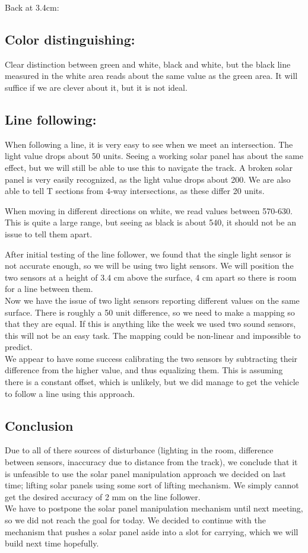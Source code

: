 Back at 3.4cm:

\subsection{Color distinguishing:}
Clear distinction
between green and white, black and white, but the black line measured in
the white area reads about the same value as the green area. It will
suffice if we are clever about it, but it is not ideal.

\subsection{Line following:}
When following a line, it is very easy to see when we meet
an intersection. The light value drops about 50 units. Seeing a working
solar panel has about the same effect, but we will still be able to use
this to navigate the track. A broken solar panel is very easily
recognized, as the light value drops about 200. We are also able to tell
T sections from 4-way intersections, as these differ 20 units.

When moving in different directions on white, we read values between
570-630. This is quite a large range, but seeing as black is about 540,
it should not be an issue to tell them apart.

After initial testing of the line follower, we found that the single
light sensor is not accurate enough, so we will be using two light
sensors. We will position the two sensors at a height of 3.4 cm above
the surface, 4 cm apart so there is room for a line between them.\\Now
we have the issue of two light sensors reporting different values on the
same surface. There is roughly a 50 unit difference, so we need to make
a mapping so that they are equal. If this is anything like the week we
used two sound sensors, this will not be an easy task. The mapping could
be non-linear and impossible to predict.\\We appear to have some success
calibrating the two sensors by subtracting their difference from the
higher value, and thus equalizing them. This is assuming there is a
constant offset, which is unlikely, but we did manage to get the vehicle
to follow a line using this approach.

\subsection{Conclusion}
Due to all of there sources of disturbance (lighting in the room,
difference between sensors, inaccuracy due to distance from the track),
we conclude that it is unfeasible to use the solar panel manipulation
approach we decided on last time; lifting solar panels using some sort
of lifting mechanism. We simply cannot get the desired accuracy of 2 mm
on the line follower.\\We have to postpone the solar panel manipulation
mechanism until next meeting, so we did not reach the goal for today. We
decided to continue with the mechanism that pushes a solar panel aside
into a slot for carrying, which we will build next time hopefully.
